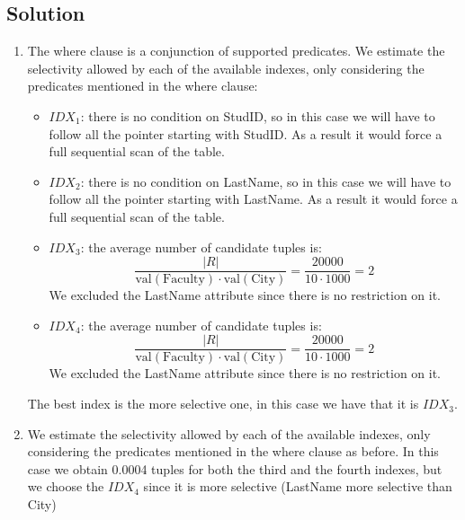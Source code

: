 \subsection*{Solution}
\begin{enumerate}
    \item The where clause is a conjunction of supported predicates.
        We estimate the selectivity allowed by each of the available indexes, only considering the predicates mentioned in the where clause:
        \begin{itemize}
            \item $IDX_1$: there is no condition on StudID, so in this case we will have to follow all the pointer starting with StudID. 
                As a result it would force a full sequential scan of the table.
            \item $IDX_2$: there is no condition on LastName, so in this case we will have to follow all the pointer starting with LastName. 
                As a result it would force a full sequential scan of the table.
            \item $IDX_3$: the average number of candidate tuples is: 
                \[\dfrac{\left\lvert R \right\rvert }{\text{val}(\text{Faculty}) \cdot \text{val}(\text{City}) }=\dfrac{20000}{10 \cdot 1000}=2\]
                We excluded the LastName attribute since there is no restriction on it. 
            \item $IDX_4$: the average number of candidate tuples is: 
                \[\dfrac{\left\lvert R \right\rvert }{\text{val}(\text{Faculty}) \cdot \text{val}(\text{City}) }=\dfrac{20000}{10 \cdot 1000}=2\]
                We excluded the LastName attribute since there is no restriction on it. 
        \end{itemize}
        The best index is the more selective one, in this case we have that it is $IDX_3$. 
    \item We estimate the selectivity allowed by each of the available indexes, only considering the predicates mentioned in the where clause as before. 
        In this case we obtain 0.0004 tuples for both the third and the fourth indexes, but we choose the $IDX_4$ since it is more selective (LastName more selective than City)
\end{enumerate}